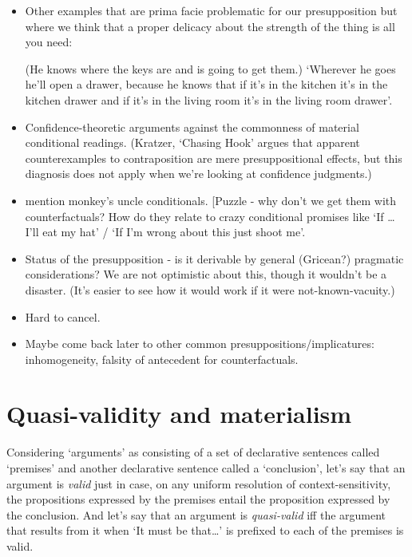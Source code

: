 \documentclass[If.tex]{subfiles}
\begin{document}

\begin{itemize}
	\item
	Other examples that are prima facie problematic for our presupposition but where we think that a proper delicacy about the strength of the thing is all you need:

 (He knows where the keys are and is going to get them.) ‘Wherever he goes he'll open a drawer, because he knows that if it's in the kitchen it's in the kitchen drawer and if it's in the living room it's in the living room drawer’.
	\item
	Confidence-theoretic arguments against the commonness of material conditional readings.  (Kratzer, ‘Chasing Hook’ argues that apparent counterexamples to contraposition are mere presuppositional effects, but this diagnosis does not apply when we're looking at confidence judgments.)
	\item
	mention monkey's uncle conditionals. {[}Puzzle - why don't we get them with counterfactuals? How do they relate to crazy conditional promises like ‘If \ldots{} I'll eat my hat’ / ‘If I'm wrong about this just shoot me’.
	\item
	Status of the presupposition - is it derivable by general (Gricean?) pragmatic considerations? We are not optimistic about this, though it wouldn't be a disaster. (It's easier to see how it would work if it were not-known-vacuity.)
	\item
	Hard to cancel.
	\item
	Maybe come back later to other common presuppositions/implicatures: inhomogeneity, falsity of antecedent for counterfactuals. 
\end{itemize}



\section{Quasi-validity and materialism}
\label{sect:quasivalidity}
Considering ‘arguments’ as consisting of a set of declarative sentences called ‘premises’ and another declarative sentence called a ‘conclusion’, let's say that an argument is \emph{valid} just in case, on any uniform resolution of context-sensitivity, the propositions expressed by the premises entail the proposition expressed by the conclusion. And let's say that an argument is \emph{quasi-valid} iff the argument that results from it when ‘It must be that\ldots{}’ is prefixed to each of the premises is valid. 
\end{document}
